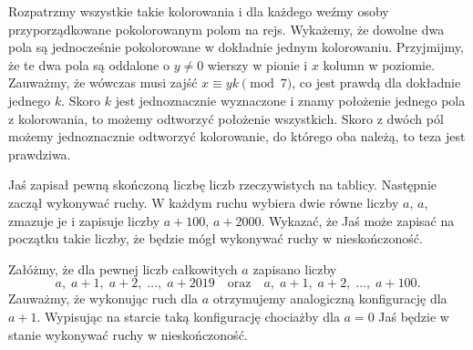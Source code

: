 \noindent
Rozpatrzmy wszystkie takie kolorowania i dla każdego weźmy osoby przyporządkowane pokolorowanym polom na rejs. Wykażemy, że dowolne dwa pola są jednocześnie pokolorowane w dokładnie jednym kolorowaniu. Przyjmijmy, że te dwa pola są oddalone o $y \neq 0$ wierszy w pionie i $x$ kolumn w poziomie. Zauważmy, że wówczas musi zajść ${x \equiv yk \pmod{7}}$, co jest prawdą dla dokładnie jednego $k$. Skoro $k$ jest jednoznacznie wyznaczone i znamy położenie jednego pola z kolorowania, to możemy odtworzyć położenie wszystkich. Skoro z dwóch pól możemy jednoznacznie odtworzyć kolorowanie, do którego oba należą, to teza jest prawdziwa.

\vspace{10px}

\begin{problem}{6}
	Jaś zapisał pewną skończoną liczbę liczb rzeczywistych na tablicy. Następnie zaczął wykonywać ruchy. W każdym ruchu wybiera dwie równe liczby $a$, $a$, zmazuje je i zapisuje liczby $a + 100$, $a + 2000$. Wykazać, że Jaś może zapisać na początku takie liczby, że będzie mógł wykonywać ruchy w nieskończoność.
\end{problem}

\noindent
Załóżmy, że dla pewnej liczb całkowitych $a$ zapisano liczby
\[
	a,\; a + 1,\; a + 2,\; ...,\; a + 2019 \quad \text{oraz} \quad
	a,\; a + 1,\; a + 2,\; ..., \; a + 100.
\]
Zauważmy, że wykonując ruch dla $a$ otrzymujemy analogiczną konfigurację dla $a + 1$. Wypisując na starcie taką konfigurację chociażby dla $a = 0$ Jaś będzie w stanie wykonywać ruchy w nieskończoność.



